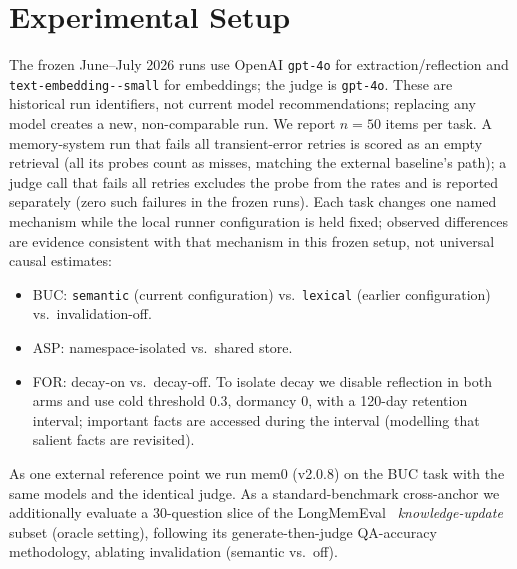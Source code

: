 \documentclass[11pt]{article}
\newcommand{\nItems}{50}                  %
\newcommand{\lmeN}{30}
\begin{document}
\section{Experimental Setup}
\label{sec:setup}
The frozen June--July 2026 runs use OpenAI \texttt{gpt-4o} for extraction/reflection and
\texttt{text-\allowbreak embedding--\allowbreak small} for embeddings; the judge is \texttt{gpt-4o}. These are
historical run identifiers, not current model recommendations; replacing any model creates
a new, non-comparable run. We report
$n=\nItems{}$ items per task. A memory-system run that fails all transient-error retries is
scored as an empty retrieval (all its probes count as misses, matching the external
baseline's path); a judge call that fails all retries excludes the probe from the rates and
is reported separately (zero such failures in the frozen runs). Each task changes one named
mechanism while the local runner configuration is held fixed; observed differences are
evidence consistent with that mechanism in this frozen setup, not universal causal estimates:
\begin{itemize}
  \item BUC: \texttt{semantic} (current configuration) vs.\ \texttt{lexical} (earlier configuration) vs.\ invalidation-off.
  \item ASP: namespace-isolated vs.\ shared store.
  \item FOR: decay-on vs.\ decay-off. To isolate decay we disable reflection in both arms and
  use cold threshold $0.3$, dormancy $0$, with a 120-day retention interval; important facts
  are accessed during the interval (modelling that salient facts are revisited).
\end{itemize}
As one external reference point we run mem0 (v2.0.8) on the BUC task with the same models and
the identical judge. As a standard-benchmark cross-anchor we additionally evaluate a
\lmeN{}-question slice of the LongMemEval~\cite{longmemeval} \emph{knowledge-update} subset
(oracle setting), following its generate-then-judge QA-accuracy methodology, ablating
invalidation (semantic vs.\ off).
\end{document}
